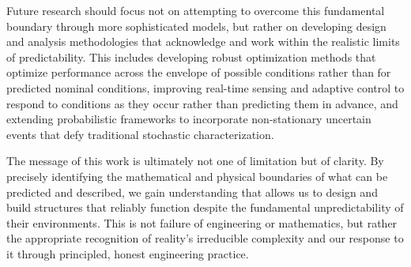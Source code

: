 ﻿\documentclass[a4paper,11pt]{article}
\theoremstyle{definition}
\begin{document}
Future research should focus not on attempting to overcome this fundamental boundary through more sophisticated models, but rather on developing design and analysis methodologies that acknowledge and work within the realistic limits of predictability. This includes developing robust optimization methods that optimize performance across the envelope of possible conditions rather than for predicted nominal conditions, improving real-time sensing and adaptive control to respond to conditions as they occur rather than predicting them in advance, and extending probabilistic frameworks to incorporate non-stationary uncertain events that defy traditional stochastic characterization.

The message of this work is ultimately not one of limitation but of clarity. By precisely identifying the mathematical and physical boundaries of what can be predicted and described, we gain understanding that allows us to design and build structures that reliably function despite the fundamental unpredictability of their environments. This is not failure of engineering or mathematics, but rather the appropriate recognition of reality's irreducible complexity and our response to it through principled, honest engineering practice.


\end{document}
